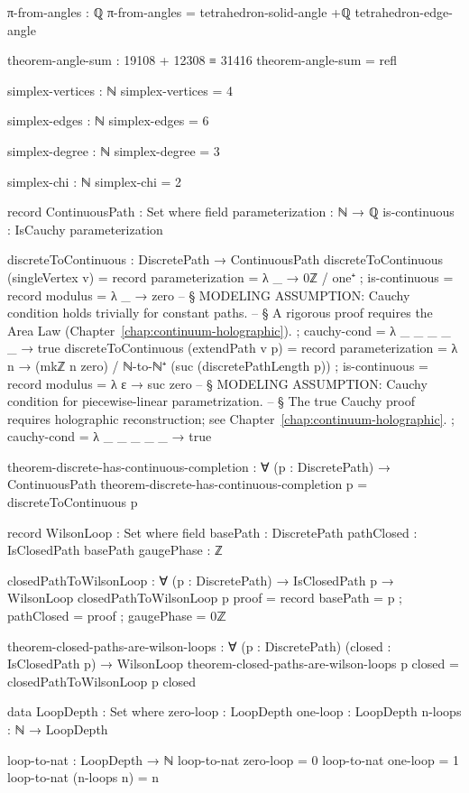 \documentclass[11pt,a4paper]{book}
\begin{document}
\begin{code}
π-from-angles : ℚ
π-from-angles = tetrahedron-solid-angle +ℚ tetrahedron-edge-angle

theorem-angle-sum : 19108 + 12308 ≡ 31416
theorem-angle-sum = refl

simplex-vertices : ℕ
simplex-vertices = 4

simplex-edges : ℕ
simplex-edges = 6

simplex-degree : ℕ
simplex-degree = 3

simplex-chi : ℕ
simplex-chi = 2

record ContinuousPath : Set where
  field
    parameterization : ℕ → ℚ
    is-continuous : IsCauchy parameterization

discreteToContinuous : DiscretePath → ContinuousPath
discreteToContinuous (singleVertex v) = record
  { parameterization = λ _ → 0ℤ / one⁺
  ; is-continuous = record
      { modulus = λ _ → zero
      -- § MODELING ASSUMPTION: Cauchy condition holds trivially for constant paths.
      -- § A rigorous proof requires the Area Law (Chapter~\ref{chap:continuum-holographic}).
      ; cauchy-cond = λ _ _ _ _ _ → true
      }
  }
discreteToContinuous (extendPath v p) = record
  { parameterization = λ n → (mkℤ n zero) / ℕ-to-ℕ⁺ (suc (discretePathLength p))
  ; is-continuous = record
      { modulus = λ ε → suc zero
      -- § MODELING ASSUMPTION: Cauchy condition for piecewise-linear parametrization.
      -- § The true Cauchy proof requires holographic reconstruction; see Chapter~\ref{chap:continuum-holographic}.
      ; cauchy-cond = λ _ _ _ _ _ → true
      }
  }

theorem-discrete-has-continuous-completion : ∀ (p : DiscretePath) → 
  ContinuousPath
theorem-discrete-has-continuous-completion p = discreteToContinuous p

record WilsonLoop : Set where
  field
    basePath : DiscretePath
    pathClosed : IsClosedPath basePath
    gaugePhase : ℤ

closedPathToWilsonLoop : ∀ (p : DiscretePath) → IsClosedPath p → WilsonLoop
closedPathToWilsonLoop p proof = record
  { basePath = p
  ; pathClosed = proof
  ; gaugePhase = 0ℤ
  }

theorem-closed-paths-are-wilson-loops : ∀ (p : DiscretePath) (closed : IsClosedPath p) →
  WilsonLoop
theorem-closed-paths-are-wilson-loops p closed = closedPathToWilsonLoop p closed

data LoopDepth : Set where
  zero-loop : LoopDepth
  one-loop  : LoopDepth
  n-loops   : ℕ → LoopDepth

loop-to-nat : LoopDepth → ℕ
loop-to-nat zero-loop = 0
loop-to-nat one-loop = 1
loop-to-nat (n-loops n) = n


\end{code}
\end{document}
